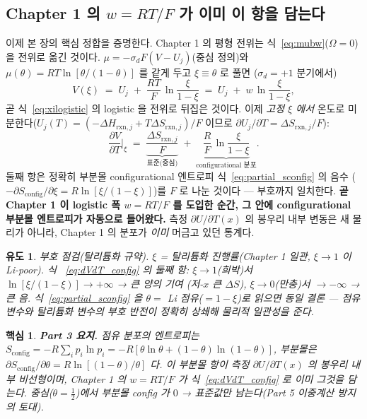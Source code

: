 \documentclass[11pt,a4paper]{article}
\newtheorem*{keybox}{핵심}
\newtheorem*{derivebox}{유도}
\newcommand{\rxn}{\mathrm{rxn}}
\newcommand{\cfg}{\mathrm{config}}
\begin{document}
\subsection{Chapter 1 의 $w=RT/F$ 가 이미 이 항을 담는다}\label{sec:w_is_config}
이제 본 장의 핵심 정합을 증명한다. Chapter 1 의 평형 전위는 식~\eqref{eq:mubw}($\Omega=0$)을
전위로 옮긴 것이다. $\mu=-\sigma_d F(V-U_j)$(중심 정의)와 $\mu(\theta)=RT\ln[\theta/(1-\theta)]$ 를 같게
두고 $\xi\equiv\theta$ 로 풀면 ($\sigma_d=+1$ 분기에서)
\begin{equation}
V(\xi) \;=\; U_j \;+\; \frac{RT}{F}\,\ln\frac{\xi}{1-\xi}
       \;=\; U_j \;+\; w\,\ln\frac{\xi}{1-\xi},
\label{eq:Vxi}
\end{equation}
곧 식~\eqref{eq:xilogistic} 의 logistic 을 전위로 뒤집은 것이다. 이제 \emph{고정 $\xi$ 에서} 온도로
미분한다($U_j(T)=(-\Delta H_{\rxn,j}+T\Delta S_{\rxn,j})/F$ 이므로 $\partial U_j/\partial T=\Delta S_{\rxn,j}/F$):
\begin{equation}
\boxed{\;
\frac{\partial V}{\partial T}\Big|_\xi
  \;=\; \underbrace{\frac{\Delta S_{\rxn,j}}{F}}_{\text{표준(중심)}}
  \;+\; \underbrace{\frac{R}{F}\,\ln\frac{\xi}{1-\xi}}_{\text{configurational 분포}}.
\;}
\label{eq:dVdT_config}
\end{equation}
둘째 항은 정확히 부분몰 configurational 엔트로피 식~\eqref{eq:partial_sconfig} 의 음수
($-\partial S_\cfg/\partial\xi = R\ln[\xi/(1-\xi)]$)를 $F$ 로 나눈 것이다 — 부호까지 일치한다.
\textbf{곧 Chapter 1 이 logistic 폭 $w=RT/F$ 를 도입한 순간, 그 안에 configurational 부분몰 엔트로피가
자동으로 들어왔다.} 측정 $\partial U/\partial T(x)$ 의 봉우리 내부 변동은 새 물리가 아니라, Chapter 1 의
분포가 \emph{이미} 머금고 있던 통계다.

\begin{derivebox}
\emph{부호 점검(탈리튬화 규약).} $\xi$ = 탈리튬화 진행률(Chapter 1 일관, $\xi\to1$ 이 Li-poor). 식
~\eqref{eq:dVdT_config} 의 둘째 항: $\xi\to1$(희박)서 $\ln[\xi/(1-\xi)]\to+\infty$ → 큰 \emph{양}의 기여
(저-$x$ 큰 $\Delta S$), $\xi\to0$(만충)서 $\to-\infty$ → 큰 \emph{음}. 식~\eqref{eq:partial_sconfig} 을
$\theta=$ Li 점유($=1-\xi$)로 읽으면 동일 결론 — 점유 변수와 탈리튬화 변수의 부호 반전이 정확히 상쇄해
물리적 일관성을 준다.
\end{derivebox}

\begin{keybox}
\textbf{Part 3 요지.} 점유 분포의 엔트로피는 $S_\cfg=-R\sum_i p_i\ln p_i=-R[\theta\ln\theta+(1-\theta)\ln(1-\theta)]$,
부분몰은 $\partial S_\cfg/\partial\theta=R\ln[(1-\theta)/\theta]$ 다. 이 부분몰 항이 측정 $\partial U/\partial T(x)$
의 봉우리 내부 비선형이며, Chapter 1 의 $w=RT/F$ 가 식~\eqref{eq:dVdT_config} 로 \emph{이미} 그것을 담는다.
중심($\theta=\tfrac12$)에서 부분몰 config 가 $0$ → 표준값만 남는다(Part 5 이중계산 방지의 토대).
\end{keybox}
\end{document}
